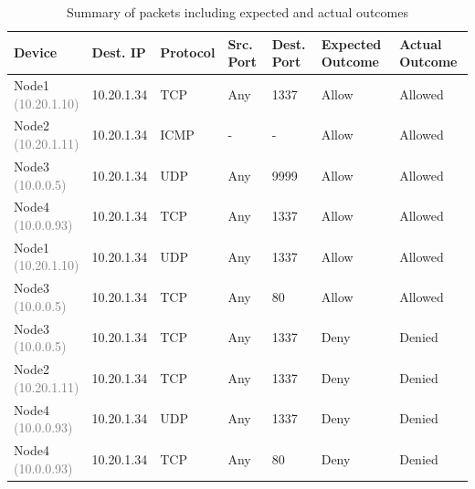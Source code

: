 \begin{table}[h]
    \centering
    \caption{Summary of packets including expected and actual outcomes}
    \label{tab:firewall_test_cases}
    \begin{tabular}{m{2.25cm}m{2cm}m{1.5cm}m{2cm}m{2cm}m{2cm}m{2cm}}
        \toprule
        Device & Dest. IP & Protocol & Src. Port & Dest. Port & Expected Outcome & Actual Outcome \\
        \midrule
        \parbox[c]{2.25cm}{\centering Node1\\\textcolor{gray}{(10.20.1.10)} \vspace*{14pt}} & 10.20.1.34 & TCP & Any & 1337 & Allow & Allowed \\
        \parbox[c]{2.25cm}{\centering Node2\\\textcolor{gray}{(10.20.1.11)} \vspace*{14pt}} & 10.20.1.34 & ICMP & - & - & Allow & Allowed \\
        \parbox[c]{2.25cm}{\centering Node3\\\textcolor{gray}{(10.0.0.5)} \vspace*{14pt}} & 10.20.1.34 & UDP & Any & 9999 & Allow & Allowed \\
        \parbox[c]{2.25cm}{\centering Node4\\\textcolor{gray}{(10.0.0.93)} \vspace*{14pt}} & 10.20.1.34 & TCP & Any & 1337 & Allow & Allowed \\
        \parbox[c]{2.25cm}{\centering Node1\\\textcolor{gray}{(10.20.1.10)} \vspace*{14pt}} & 10.20.1.34 & UDP & Any & 1337 & Allow & Allowed \\
        \parbox[c]{2.25cm}{\centering Node3\\\textcolor{gray}{(10.0.0.5)} \vspace*{14pt}} & 10.20.1.34 & TCP & Any & 80 & Allow & Allowed \\
        \parbox[c]{2.25cm}{\centering Node3\\\textcolor{gray}{(10.0.0.5)} \vspace*{14pt}} & 10.20.1.34 & TCP & Any & 1337 & Deny & Denied \\
        \parbox[c]{2.25cm}{\centering Node2\\\textcolor{gray}{(10.20.1.11)} \vspace*{14pt}} & 10.20.1.34 & TCP & Any & 1337 & Deny & Denied \\
        \parbox[c]{2.25cm}{\centering Node4\\\textcolor{gray}{(10.0.0.93)} \vspace*{14pt}} & 10.20.1.34 & UDP & Any & 1337 & Deny & Denied \\
        \parbox[c]{2.25cm}{\centering Node4\\\textcolor{gray}{(10.0.0.93)} \vspace*{14pt}} & 10.20.1.34 & TCP & Any & 80 & Deny & Denied \\
        \bottomrule
    \end{tabular}
    
\end{table}


